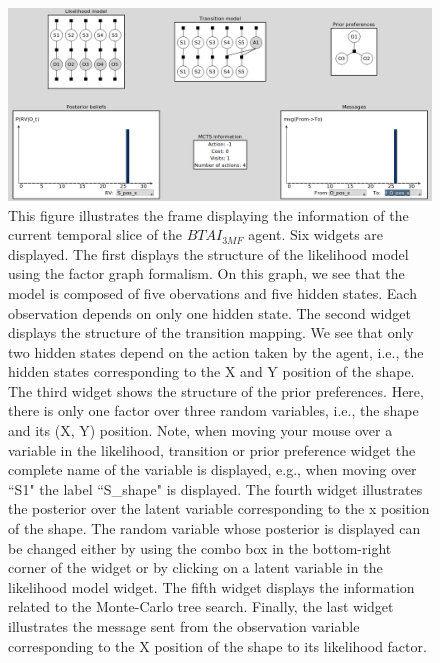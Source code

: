 \documentclass[twoside,11pt]{article}
\begin{document}
\begin{figure}[H]
	\begin{center}
	\includegraphics[scale=0.3]{ts_frame_for_current_ts}
	\end{center}
  \caption{This figure illustrates the frame displaying the information of the current temporal slice of the $BTAI_{3MF}$ agent. Six widgets are displayed. The first displays the structure of the likelihood model using the factor graph formalism. On this graph, we see that the model is composed of five obervations and five hidden states. Each observation depends on only one hidden state. The second widget displays the structure of the transition mapping. We see that only two hidden states depend on the action taken by the agent, i.e., the hidden states corresponding to the X and Y position of the shape. The third widget shows the structure of the prior preferences. Here, there is only one factor over three random variables, i.e., the shape and its (X, Y) position. Note, when moving your mouse over a variable in the likelihood, transition or prior preference widget the complete name of the variable is displayed, e.g., when moving over ``S1" the label ``S\_shape" is displayed. The fourth widget illustrates the posterior over the latent variable corresponding to the x position of the shape. The random variable whose posterior is displayed can be changed either by using the combo box in the bottom-right corner of the widget or by clicking on a latent variable in the likelihood model widget. The fifth widget displays the information related to the Monte-Carlo tree search. Finally, the last widget illustrates the message sent from the observation variable corresponding to the X position of the shape to its likelihood factor.}
   \label{fig:gui_tsf_for_current_ts}
\end{figure}
\end{document}
